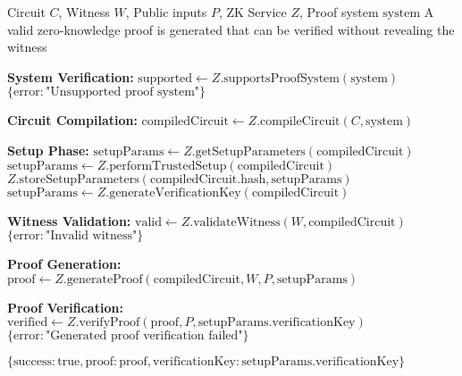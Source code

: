 \begin{protocol}
\label{prot:zk-proof-generation}
\begin{algorithmic}[1]
\Require Circuit $C$, Witness $W$, Public inputs $P$, ZK Service $Z$, Proof system $\text{system}$
\Ensure A valid zero-knowledge proof is generated that can be verified without revealing the witness

\State \textbf{System Verification:}
\State $\text{supported} \gets Z.\text{supportsProofSystem}(\text{system})$
    \State \Return $\{\text{error}: \text{"Unsupported proof system"}\}$
\EndIf

\State \textbf{Circuit Compilation:}
\State $\text{compiledCircuit} \gets Z.\text{compileCircuit}(C, \text{system})$

\State \textbf{Setup Phase:}
    \State $\text{setupParams} \gets Z.\text{getSetupParameters}(\text{compiledCircuit})$
        \State $\text{setupParams} \gets Z.\text{performTrustedSetup}(\text{compiledCircuit})$
        \State $Z.\text{storeSetupParameters}(\text{compiledCircuit}.\text{hash}, \text{setupParams})$
    \EndIf
\Else
    \State $\text{setupParams} \gets Z.\text{generateVerificationKey}(\text{compiledCircuit})$
\EndIf

\State \textbf{Witness Validation:}
\State $\text{valid} \gets Z.\text{validateWitness}(W, \text{compiledCircuit})$
    \State \Return $\{\text{error}: \text{"Invalid witness"}\}$
\EndIf

\State \textbf{Proof Generation:}
\State $\text{proof} \gets Z.\text{generateProof}(\text{compiledCircuit}, W, P, \text{setupParams})$

\State \textbf{Proof Verification:}
\State $\text{verified} \gets Z.\text{verifyProof}(\text{proof}, P, \text{setupParams}.\text{verificationKey})$
    \State \Return $\{\text{error}: \text{"Generated proof verification failed"}\}$
\EndIf

\State \Return $\{\text{success}: \text{true}, \text{proof}: \text{proof}, \text{verificationKey}: \text{setupParams}.\text{verificationKey}\}$
\end{algorithmic}
\end{protocol}
